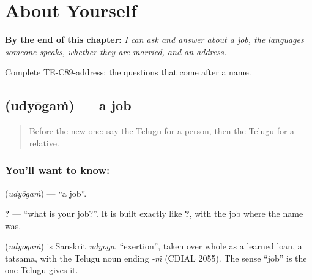
\chapter{About Yourself}
\label{ch:te-about-yourself}

\begin{chapteropening}
\textbf{By the end of this chapter:} \emph{I can ask and answer about a job, the languages someone speaks, whether they are married, and an address.}

Complete TE-C89-address: the questions that come after a name.
\end{chapteropening}

\section[\texorpdfstring{\te{ఉద్యోగం} (udyōgaṁ)}{ఉద్యోగం (udyōgaṁ)}]{ (udyōgaṁ) — a job}

\label{lesson:TE-C89-job}



\begin{quote}
Before the new one: say the Telugu for a person, then the Telugu for a relative.
\end{quote}

\subsection*{You'll want to know: }
\textbf{} (\emph{udyōgaṁ}) — \textquotedblleft{}a job\textquotedblright{}.

\textbf{  ?} — \textquotedblleft{}what is your job?\textquotedblright{}. It is built exactly like \textbf{  ?}, with the job where the name was.

\begin{cousinweb}
\textbf{} (\emph{udyōgaṁ}) is Sanskrit \emph{udyoga}, \textquotedblleft{}exertion\textquotedblright{}, taken over whole as a learned loan, a tatsama, with the Telugu noun ending \emph{-ṁ} (CDIAL 2055). The sense \textquotedblleft{}job\textquotedblright{} is the one Telugu gives it.
\end{cousinweb}

